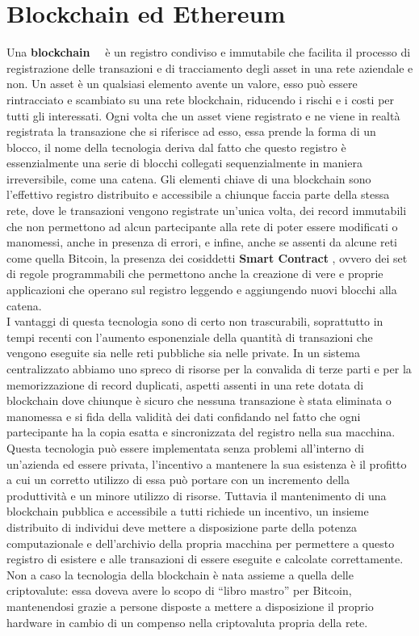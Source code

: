 \section{Blockchain ed Ethereum}
\label{sub:bc}
Una \textbf{blockchain}~\cite{block1}~\cite{block2} è un registro condiviso e immutabile che facilita il processo di registrazione
delle transazioni e di tracciamento degli asset in una rete aziendale e non. Un asset è un qualsiasi
elemento avente un valore, esso può essere rintracciato e scambiato su una rete blockchain,
riducendo i rischi e i costi per tutti gli interessati. Ogni volta che un asset viene registrato e
ne viene in realtà registrata la transazione che si riferisce ad esso, essa prende la forma di un blocco,
il nome della tecnologia deriva dal fatto che questo registro è essenzialmente una serie di blocchi
collegati sequenzialmente in maniera irreversibile, come una catena.
Gli elementi chiave di una blockchain sono l’effettivo registro distribuito e accessibile a chiunque faccia
parte della stessa rete, dove le transazioni vengono registrate un’unica volta, dei record immutabili
che non permettono ad alcun partecipante alla rete di poter essere modificati o manomessi,
anche in presenza di errori, e infine, anche se assenti da alcune reti come quella Bitcoin,
la presenza dei cosiddetti \textbf{Smart Contract} \label{sub:smp}, ovvero dei set di regole programmabili che permettono
anche la creazione di vere e proprie applicazioni che operano
sul registro leggendo e aggiungendo nuovi blocchi alla catena. \\ 
I vantaggi di questa tecnologia sono di certo non trascurabili, soprattutto in tempi
recenti con l’aumento esponenziale della quantità di transazioni che vengono eseguite
sia nelle reti pubbliche sia nelle private.
In un sistema centralizzato abbiamo uno spreco di risorse per la convalida di terze parti
e per la memorizzazione di record duplicati, aspetti assenti in una rete dotata di blockchain
dove chiunque è sicuro che nessuna transazione è stata eliminata o manomessa e si fida della
validità dei dati confidando nel fatto che ogni partecipante ha la copia esatta e sincronizzata
del registro nella sua macchina.
Questa tecnologia può essere implementata senza problemi all’interno di un’azienda ed essere privata,
l’incentivo a mantenere la sua esistenza è il profitto a cui un corretto utilizzo di essa può portare
con un incremento della produttività e un minore utilizzo di risorse.
Tuttavia il mantenimento di una blockchain pubblica e accessibile a tutti richiede un incentivo,
un insieme distribuito di individui deve mettere a disposizione parte della potenza computazionale
e dell’archivio della propria macchina per permettere a questo registro di esistere
e alle transazioni di essere eseguite e calcolate correttamente.
Non a caso la tecnologia della blockchain è nata assieme a quella delle criptovalute:
essa doveva avere lo scopo di “libro mastro” per Bitcoin, mantenendosi grazie a persone
disposte a mettere a disposizione il proprio hardware in cambio di un compenso
nella criptovaluta propria della rete.


